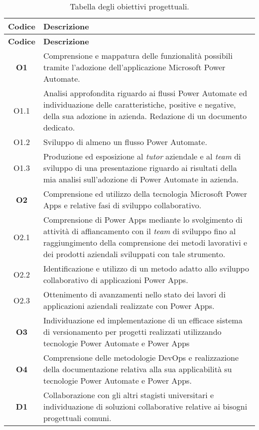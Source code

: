 \begin{longtable}{|c|p{11cm}|}
\caption{Tabella degli obiettivi progettuali.}
\label{tab:obiettiviProgettuali}\\
\hline \textbf{Codice} & \textbf{Descrizione}\\ \hline \endfirsthead
\hline \textbf{Codice} & \textbf{Descrizione}\\ \hline \endhead
\hline \endfoot
\hline \endlastfoot
\textbf{O1}    & Comprensione e mappatura delle funzionalità possibili tramite l'adozione dell'applicazione Microsoft Power Automate.\\
\hline O1.1  & Analisi approfondita riguardo ai flussi Power Automate ed individuazione delle caratteristiche, positive e negative, della sua adozione in azienda. Redazione di un documento dedicato.\\
\hline O1.2  & Sviluppo di almeno un flusso Power Automate.\\
\hline O1.3  & Produzione ed esposizione al \emph{tutor} aziendale e al \emph{team} di sviluppo di una presentazione riguardo ai risultati della mia analisi sull'adozione di Power Automate in azienda.\\
\hline \textbf{O2}  & Comprensione ed utilizzo della tecnologia Microsoft Power Apps e relative fasi di sviluppo collaborativo.\\
\hline O2.1  & Comprensione di Power Apps mediante lo svolgimento di attività di affiancamento con il \emph{team} di sviluppo fino al raggiungimento della comprensione dei metodi lavorativi e dei prodotti aziendali sviluppati con tale strumento.\\
\hline O2.2  & Identificazione e utilizzo di un metodo adatto allo sviluppo collaborativo di applicazioni Power Apps.\\
\hline O2.3  & Ottenimento di avanzamenti nello stato dei lavori di applicazioni aziendali realizzate con Power Apps.\\
\hline \textbf{O3}  & Individuazione ed implementazione di un efficace sistema di versionamento per progetti realizzati utilizzando tecnologie Power Automate e Power Apps\\
\hline \textbf{O4}  & Comprensione delle metodologie \gls{DevOps} e realizzazione della documentazione relativa alla sua applicabilità su tecnologie Power Automate e Power Apps.\\
\hline 
\hline \textbf{D1}  & Collaborazione con gli altri stagisti universitari e individuazione di soluzioni collaborative relative ai bisogni progettuali comuni.\\

\end{longtable}

